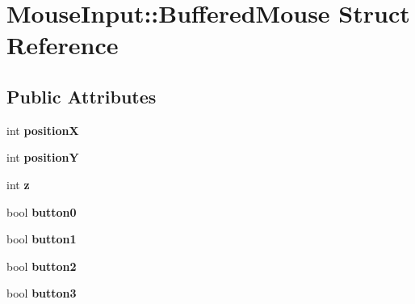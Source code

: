 \hypertarget{struct_mouse_input_1_1_buffered_mouse}{\section{Mouse\-Input\-:\-:Buffered\-Mouse Struct Reference}
\label{struct_mouse_input_1_1_buffered_mouse}
}
\subsection*{Public Attributes}
\begin{DoxyCompactItemize}
\item 
\hypertarget{struct_mouse_input_1_1_buffered_mouse_a98d61912de159174f7b3a101d54483e7}{int {\bfseries position\-X}}\label{struct_mouse_input_1_1_buffered_mouse_a98d61912de159174f7b3a101d54483e7}

\item 
\hypertarget{struct_mouse_input_1_1_buffered_mouse_a003d88ef48d3b93184b2ab8f7fd1d57b}{int {\bfseries position\-Y}}\label{struct_mouse_input_1_1_buffered_mouse_a003d88ef48d3b93184b2ab8f7fd1d57b}

\item 
\hypertarget{struct_mouse_input_1_1_buffered_mouse_a75646d695cccf1b4186cc3f19fcbf2f4}{int {\bfseries z}}\label{struct_mouse_input_1_1_buffered_mouse_a75646d695cccf1b4186cc3f19fcbf2f4}

\item 
\hypertarget{struct_mouse_input_1_1_buffered_mouse_a719a3d8887c6b23238349b2dc7f6f12b}{bool {\bfseries button0}}\label{struct_mouse_input_1_1_buffered_mouse_a719a3d8887c6b23238349b2dc7f6f12b}

\item 
\hypertarget{struct_mouse_input_1_1_buffered_mouse_a60c566fed793fd73c531910420571c06}{bool {\bfseries button1}}\label{struct_mouse_input_1_1_buffered_mouse_a60c566fed793fd73c531910420571c06}

\item 
\hypertarget{struct_mouse_input_1_1_buffered_mouse_acf69dfc1126ed9bc04dd5774350ef6d6}{bool {\bfseries button2}}\label{struct_mouse_input_1_1_buffered_mouse_acf69dfc1126ed9bc04dd5774350ef6d6}

\item 
\hypertarget{struct_mouse_input_1_1_buffered_mouse_a254afc2c2f5b6045c4a26d0377887073}{bool {\bfseries button3}}\label{struct_mouse_input_1_1_buffered_mouse_a254afc2c2f5b6045c4a26d0377887073}


\end{DoxyCompactItemize}
